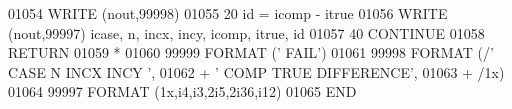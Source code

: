 \begin{DoxyCode}
01054       \textcolor{keyword}{WRITE} (nout,99998)
01055    20 id = icomp - itrue
01056       \textcolor{keyword}{WRITE} (nout,99997) icase, n, incx, incy, icomp, itrue, id
01057    40 \textcolor{keywordflow}{CONTINUE}
01058       \textcolor{keywordflow}{RETURN}
01059 \textcolor{comment}{*}
01060 99999 \textcolor{keyword}{FORMAT} (\textcolor{stringliteral}{'                                       FAIL'})
01061 99998 \textcolor{keyword}{FORMAT} (/\textcolor{stringliteral}{' CASE  N INCX INCY                               '},
01062      +       \textcolor{stringliteral}{' COMP                                TRUE     DIFFERENCE'},
01063      +       /1x)
01064 99997 \textcolor{keyword}{FORMAT} (1x,i4,i3,2i5,2i36,i12)
01065 \textcolor{keyword}{      END}
\end{DoxyCode}
